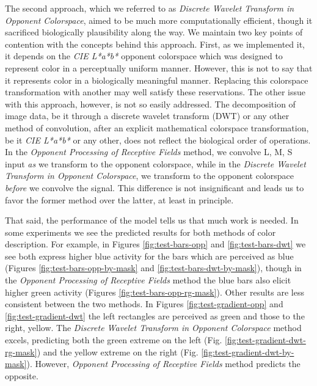 \documentclass[journal,onecolumn]{IEEEtran}
\begin{document}
The second approach, which we referred to as \textit{Discrete Wavelet Transform in Opponent Colorspace}, aimed to be much more computationally efficient, though it sacrificed biologically plausibility along the way. We maintain two key points of contention with the concepts behind this approach. First, as we implemented it, it depends on the \textit{CIE L*a*b*} opponent colorspace which was designed to represent color in a perceptually uniform manner. However, this is not to say that it represents color in a biologically meaningful manner. Replacing this colorspace transformation with another may well satisfy these reservations. The other issue with this approach, however, is not so easily addressed. The decomposition of image data, be it through a discrete wavelet transform (DWT) or any other method of convolution, after an explicit mathematical colorspace transformation, be it \textit{CIE L*a*b*} or any other, does not reflect the biological order of operations. In the \textit{Opponent Processing of Receptive Fields} method, we convolve L, M, S input \textit{as} we transform to the opponent colorspace, while in the \textit{Discrete Wavelet Transform in Opponent Colorspace}, we transform to the opponent colorspace \textit{before} we convolve the signal. This difference is not insignificant and leads us to favor the former method over the latter, at least in principle.

That said, the performance of the model tells us that much work is needed. In some experiments we see the predicted results for both methods of color description. For example, in Figures \ref{fig:test-bars-opp} and \ref{fig:test-bars-dwt} we see both express higher blue activity for the bars which are perceived as blue (Figures \ref{fig:test-bars-opp-by-mask} and \ref{fig:test-bars-dwt-by-mask}), though in the \textit{Opponent Processing of Receptive Fields} method the blue bars also elicit higher green activity (Figures \ref{fig:test-bars-opp-rg-mask}). Other results are less consistent between the two methods. In Figures \ref{fig:test-gradient-opp} and \ref{fig:test-gradient-dwt} the left rectangles are perceived as green and those to the right, yellow. The \textit{Discrete Wavelet Transform in Opponent Colorspace} method excels, predicting both the green extreme on the left (Fig. \ref{fig:test-gradient-dwt-rg-mask}) and the yellow extreme on the right (Fig. \ref{fig:test-gradient-dwt-by-mask}). However, \textit{Opponent Processing of Receptive Fields} method predicts the opposite.

\newpage
\end{document}
